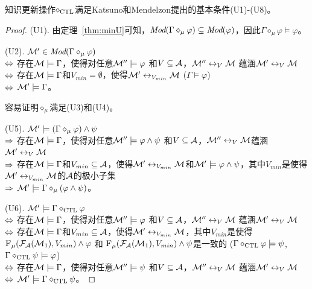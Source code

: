 \begin{theorem}\label{thm:U1toU8}
	知识更新操作$\diamond_{\textrm{CTL}}$满足Katsuno和Mendelzon提出的基本条件(U1)-(U8)。
\end{theorem}
\begin{proof}
	(U1). 由定理~\ref{thm:minU}可知，$\textit{Mod}(\Gamma \diamond_{\mu} \varphi) \subseteq \textit{Mod}(\varphi)$，因此$\Gamma \diamond_{\mu} \varphi \models \varphi$。
	
	(U2). ${\cal M}'\in \textit{Mod}(\Gamma \diamond_{\mu} \varphi)$\\
	$\Leftrightarrow$ 存在${\cal M} \models \Gamma$，使得对任意${\cal M}'' \models \varphi$ 和$V \subseteq {\cal A}$，${\cal M}'' \leftrightarrow_{V} {\cal M}$ 蕴涵${\cal M}' \leftrightarrow_{V} {\cal M}$\\
	$\Leftrightarrow$ 存在${\cal M} \models \Gamma$和$V_{min} = \emptyset$，使得${\cal M}' \leftrightarrow_{V_{min}} {\cal M}$ \hfill ($\Gamma \models \varphi$)\\
	$\Leftrightarrow$ ${\cal M}'\models \Gamma$。
	
	
	容易证明$\diamond_{\mu}$满足(U3)和(U4)。
	
	(U5). ${\cal M}'\models (\Gamma \diamond_{\mu} \varphi) \wedge \psi$\\
	$\Rightarrow$  存在${\cal M} \models \Gamma$，使得对任意${\cal M}'' \models \varphi \wedge \psi$ 和$V \subseteq {\cal A}$，${\cal M}'' \leftrightarrow_{V} {\cal M}$蕴涵${\cal M}' \leftrightarrow_{V} {\cal M}$\\
	$\Rightarrow$ 存在${\cal M} \models \Gamma$和$V_{min} \subseteq {\cal A}$，使得${\cal M}' \leftrightarrow_{V_{min}} {\cal M}$和${\cal M}' \models \varphi \wedge \psi$，其中$V_{min}$是使得${\cal M}' \leftrightarrow_{V_{min}} {\cal M}$的${\cal A}$的极小子集\\
	$\Rightarrow$ ${\cal M}' \models \Gamma \diamond_{\mu} (\varphi \wedge \psi)$。
	
	
	
	(U6). ${\cal M}'\models \Gamma \diamond_{\textrm{CTL}} \varphi$\\
	$\Leftrightarrow$ 存在${\cal M} \models \Gamma$，使得对任意${\cal M}'' \models \varphi$ 和$V \subseteq {\cal A}$，${\cal M}'' \leftrightarrow_{V} {\cal M}$ 蕴涵${\cal M}' \leftrightarrow_{V} {\cal M}$\\
	$\Leftrightarrow$ 存在${\cal M} \models \Gamma$和$V_{min} \subseteq {\cal A}$，使得${\cal M}' \leftrightarrow_{V_{min}} {\cal M}$，其中$V_{min}$是使得${\textsc{F}_{\textsc{$\mu$}}}({\cal F}_{{\cal A}}({\cal M}_1), V_{min}) \wedge \varphi$ 和 ${\textsc{F}_{\textsc{$\mu$}}}({\cal F}_{{\cal A}}({\cal M}_1), V_{min}) \wedge \psi$是一致的 \hfill ($\Gamma \diamond_{\textrm{CTL}} \varphi \models \psi$, $\Gamma \diamond_{\textrm{CTL}} \psi \models \varphi$) \\ %
	$\Leftrightarrow$ 存在${\cal M} \models \Gamma$，使得对任意${\cal M}'' \models \psi$ 和$V \subseteq {\cal A}$，${\cal M}'' \leftrightarrow_{V} {\cal M}$ 蕴涵${\cal M}' \leftrightarrow_{V} {\cal M}$\\
	$\Leftrightarrow$ ${\cal M}' \models \Gamma \diamond_{\textrm{CTL}} \psi$。
	

\end{proof}
